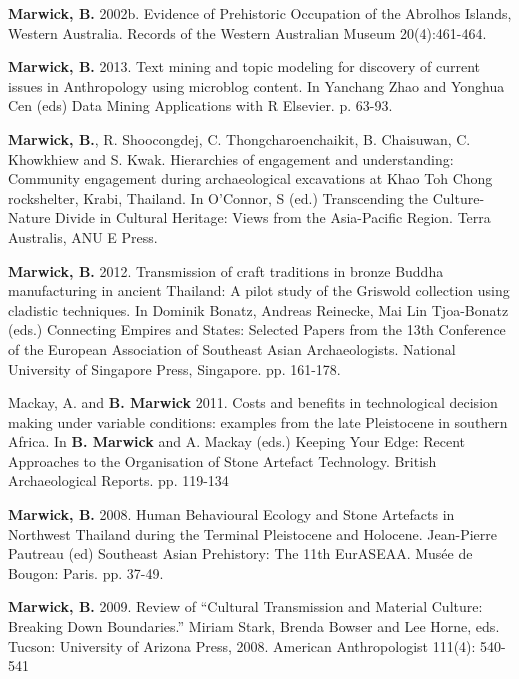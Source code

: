 \documentclass[11pt,article,oneside]{memoir}
\begin{document}
\ind \textbf{Marwick, B.} 2002b. Evidence of Prehistoric Occupation of the Abrolhos Islands, Western Australia. Records of the Western Australian Museum 20(4):461-464.

\bigskip


\ind \textbf{Marwick, B.} 2013. Text mining and topic modeling for discovery of current issues in Anthropology using microblog content. In  Yanchang Zhao and Yonghua Cen (eds) Data Mining Applications with R Elsevier. p. 63-93.

\ind \textbf{Marwick, B.}, R. Shoocongdej, C. Thongcharoenchaikit, B. Chaisuwan, C. Khowkhiew and S. Kwak.  Hierarchies of engagement and understanding: Community engagement during archaeological excavations at Khao Toh Chong rockshelter, Krabi, Thailand. In O’Connor, S (ed.) Transcending the Culture-Nature Divide in Cultural Heritage: Views from the Asia-Pacific Region. Terra Australis, ANU E Press. 

\ind \textbf{Marwick, B.} 2012. Transmission of craft traditions in bronze Buddha manufacturing in ancient Thailand: A pilot study of the Griswold collection using cladistic techniques. In Dominik Bonatz, Andreas Reinecke, Mai Lin Tjoa-Bonatz (eds.) Connecting Empires and States: Selected Papers from the 13th Conference of the European Association of Southeast Asian Archaeologists. National University of Singapore Press, Singapore. pp. 161-178. 

\ind Mackay, A. and \textbf{B. Marwick} 2011. Costs and benefits in technological decision making under variable conditions: examples from the late Pleistocene in southern Africa. In \textbf{B. Marwick} and A. Mackay (eds.) Keeping Your Edge: Recent Approaches to the Organisation of Stone Artefact Technology. British Archaeological Reports.  pp. 119-134 

\ind \textbf{Marwick, B.} 2008. Human Behavioural Ecology and Stone Artefacts in Northwest Thailand during the Terminal Pleistocene and Holocene. Jean-Pierre Pautreau (ed) Southeast Asian Prehistory: The 11th EurASEAA. Musée de Bougon: Paris. pp. 37-49. 

\bigskip


\ind \textbf{Marwick, B.} 2009. Review of “Cultural Transmission and Material Culture: Breaking Down Boundaries.” Miriam Stark, Brenda Bowser and Lee Horne, eds. Tucson: University of Arizona Press, 2008. American Anthropologist 111(4): 540-541
\end{document}
